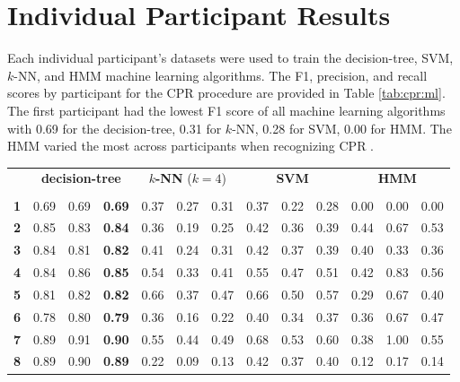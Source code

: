 \section{Individual Participant Results}
\label{sec:Results:Individual}

Each individual participant's datasets were used to train the decision-tree, SVM, $k$-NN, and HMM machine learning algorithms. The F1, precision, and recall scores by participant for the CPR procedure are provided in Table \ref{tab:cpr:ml}. The first participant had the lowest F1 score of all machine learning algorithms with 0.69 for the decision-tree, 0.31 for $k$-NN, 0.28 for SVM, 0.00 for HMM. The HMM varied the most across participants when recognizing CPR .
\newcommand*\rotv{\multirow{2}{*}{\rotatebox[origin=c]{45}}}
\begin{table}[h]
	\centering
	\begin{tabular}{lllllllllllll}
		\multirow{2}{*}{\rotatebox[origin=c]{45}{\textbf{Participant}}} & \multicolumn{3}{c}{\textbf{decision-tree}} & \multicolumn{3}{c}{\textbf{$k$-NN} ($k=4$)} & \multicolumn{3}{c}{\textbf{SVM}} & \multicolumn{3}{c}{\textbf{HMM}} \\
		& \rot{Precision}     & \rot{Recall}    & \rot{F1}    & \rot{Precision}     & \rot{Recall}    & \rot{F1}  & \rot{Precision}     & \rot{Recall}    & \rot{F1} & \rot{Precision}     & \rot{Recall}    & \rot{F1} \\
		\textbf{1}   & 0.69 & 0.69 & \textbf{0.69} & 0.37 & 0.27 & 0.31 & 0.37 & 0.22 & 0.28 & 0.00 & 0.00 & 0.00 \\
		\textbf{2}   & 0.85 & 0.83 & \textbf{0.84} & 0.36 & 0.19 & 0.25 & 0.42 & 0.36 & 0.39 & 0.44 & 0.67 & 0.53 \\
		\textbf{3}   & 0.84 & 0.81 & \textbf{0.82} & 0.41 & 0.24 & 0.31 & 0.42 & 0.37 & 0.39 & 0.40 & 0.33 & 0.36 \\
		\textbf{4}   & 0.84 & 0.86 & \textbf{0.85} & 0.54 & 0.33 & 0.41 & 0.55 & 0.47 & 0.51 & 0.42 & 0.83 & 0.56 \\
		\textbf{5}   & 0.81 & 0.82 & \textbf{0.82} & 0.66 & 0.37 & 0.47 & 0.66 & 0.50 & 0.57 & 0.29 & 0.67 & 0.40 \\
		\textbf{6}   & 0.78 & 0.80 & \textbf{0.79} & 0.36 & 0.16 & 0.22 & 0.40 & 0.34 & 0.37 & 0.36 & 0.67 & 0.47 \\
		\textbf{7}   & 0.89 & 0.91 & \textbf{0.90} & 0.55 & 0.44 & 0.49 & 0.68 & 0.53 & 0.60 & 0.38 & 1.00 & 0.55 \\
		\textbf{8}   & 0.89 & 0.90 & \textbf{0.89} & 0.22 & 0.09 & 0.13 & 0.42 & 0.37 & 0.40 & 0.12 & 0.17 & 0.14 \\

\end{tabular}
\end{table}
